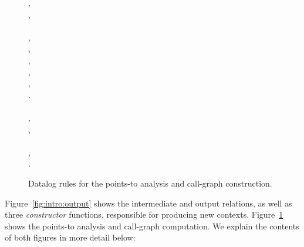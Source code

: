 \begin{figure}[tb!p]
\begin{datalog}
, \\
, \\
 \dlIf{} \\
    , \\
    , \\
    ,\\
    , \\
    ,\\
    . \\
\\
, \\
, \\
 \dlIf{} \\
    , \\
    .
\end{datalog}
\caption[]{Datalog rules for the points-to analysis and call-graph construction.}
\label{fig:intro:baserules}
\end{figure}

Figure~\ref{fig:intro:output} shows the intermediate and output relations, as well as three \emph{constructor} functions, responsible for producing new contexts. Figure~\ref{fig:intro:baserules} shows the points-to analysis and call-graph computation. We explain the contents of both figures in more detail below:


